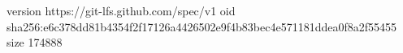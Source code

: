 version https://git-lfs.github.com/spec/v1
oid sha256:e6c378dd81b4354f2f17126a4426502e9f4b83bec4e571181ddea0f8a2f55455
size 174888
